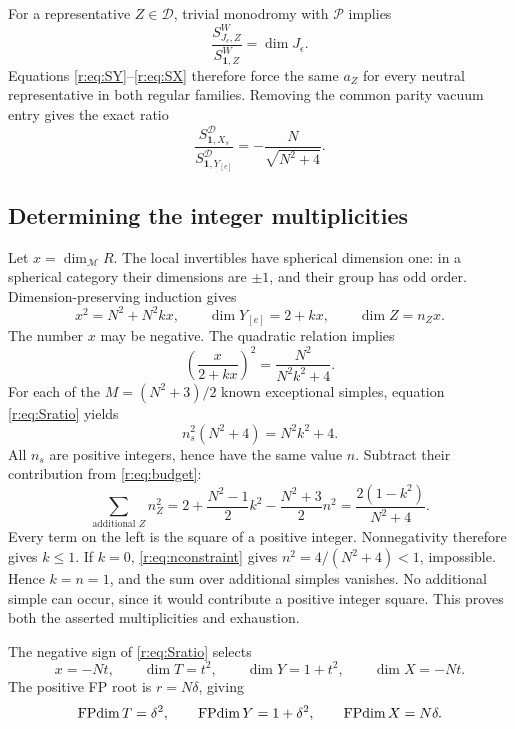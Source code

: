 \documentclass[11pt,a4paper]{article}
\numberwithin{equation}{section}
\theoremstyle{definition}\newtheorem{definition}[theorem]{Definition}
\theoremstyle{remark}\newtheorem{remark}[theorem]{Remark}
\newcommand{\one}{\mathbf1}\newcommand{\B}{\mathcal B}\newcommand{\W}{W_N}
\newcommand{\Par}{\mathcal P}\newcommand{\Neu}{\mathcal D}
\newcommand{\Mod}{\mathcal M}\newcommand{\HI}{\mathcal H}
\begin{document}
For a representative \(Z\in\Neu\), trivial monodromy with \(\Par\)
implies
\[
             \frac{S^W_{J_\epsilon,Z}}{S^W_{\one,Z}}
                       =\dim J_\epsilon.
\]
Equations \eqref{r:eq:SY}--\eqref{r:eq:SX} therefore force the same
\(a_Z\) for every neutral representative in both regular families.
Removing the common parity vacuum entry gives the exact ratio
\begin{equation}\label{r:eq:Sratio}
                \boxed{\frac{S^\Neu_{\one,X_s}}
                              {S^\Neu_{\one,Y_{[e]}}}
                       =-\frac N{\sqrt{N^2+4}}.}
\end{equation}

\subsection{Determining the integer multiplicities}

Let \(x=\dim_{\Mod}R\). The local invertibles have spherical
dimension one: in a spherical category their dimensions are
\(\pm1\), and their group has odd order. Dimension-preserving
induction gives
\[
 x^2=N^2+N^2kx,\qquad
 \dim Y_{[e]}=2+kx,\qquad
 \dim Z=n_Zx.
\]
The number \(x\) may be negative. The quadratic relation implies
\[
        \left(\frac{x}{2+kx}\right)^2
                         =\frac{N^2}{N^2k^2+4}.
\]
For each of the \(M=(N^2+3)/2\) known exceptional simples,
equation \eqref{r:eq:Sratio} yields
\begin{equation}\label{r:eq:nconstraint}
                    n_s^2(N^2+4)=N^2k^2+4.
\end{equation}
All \(n_s\) are positive integers, hence have the same value \(n\).
Subtract their contribution from \eqref{r:eq:budget}:
\begin{equation}\label{r:eq:unused}
 \boxed{\sum_{\text{additional }Z}n_Z^2
 =2+\frac{N^2-1}{2}k^2-\frac{N^2+3}{2}n^2
 =\frac{2(1-k^2)}{N^2+4}.}
\end{equation}
Every term on the left is the square of a positive integer.
Nonnegativity therefore gives $k\leq1$. If $k=0$,
\eqref{r:eq:nconstraint} gives \(n^2=4/(N^2+4)<1\), impossible.
Hence $k=n=1$, and the sum over additional simples vanishes.
No additional simple can occur, since it would contribute a positive
integer square. This proves both the asserted multiplicities and
exhaustion.

The negative sign of \eqref{r:eq:Sratio} selects
\[
 x=-Nt,\qquad
 \dim T=t^2,\qquad
 \dim Y=1+t^2,\qquad
 \dim X=-Nt.
\]
The positive FP root is \(r=N\delta\), giving
\[
 \operatorname{FPdim} T=\delta^2,\qquad
 \operatorname{FPdim} Y=1+\delta^2,\qquad
 \operatorname{FPdim} X=N\delta.
\]
\end{document}
